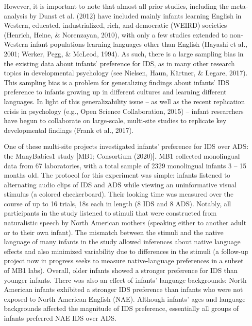 \documentclass[
  ,man,floatsintext]{apa6}
\begin{document}
However, it is important to note that almost all prior studies, including the meta-analysis by Dunst et al. (2012) have included mainly infants learning English in Western, educated, industrialized, rich, and democratic (WEIRD) societies (Henrich, Heine, \& Norenzayan, 2010), with only a few studies extended to non-Western infant populations learning languages other than English (Hayashi et al., 2001; Werker, Pegg, \& McLeod, 1994). As such, there is a large sampling bias in the existing data about infants' preference for IDS, as in many other research topics in developmental psychology (see Nielsen, Haun, Kärtner, \& Legare, 2017). This sampling bias is a problem for generalizing findings about infants' IDS preference to infants growing up in different cultures and learning different languages. In light of this generalizability issue -- as well as the recent replication crisis in psychology (e.g., Open Science Collaboration, 2015) -- infant researchers have begun to collaborate on large-scale, multi-site studies to replicate key developmental findings (Frank et al., 2017).

One of these multi-site projects investigated infants' preference for IDS over ADS: the ManyBabies1 study {[}MB1; Consortium (2020){]}. MB1 collected monolingual data from 67 laboratories, with a total sample of 2329 monolingual infants 3 -- 15 months old. The protocol for this experiment was simple: infants listened to alternating audio clips of IDS and ADS while viewing an uninformative visual stimulus (a colored checkerboard). Their looking time was measured over the course of up to 16 trials, 18s each in length (8 IDS and 8 ADS). Notably, all participants in the study listened to stimuli that were constructed from naturalistic speech by North American mothers (speaking either to another adult or to their own infant). The mismatch between the stimuli and the native language of many infants in the study allowed inferences about native language effects and also minimized variability due to differences in the stimuli (a follow-up project now in progress seeks to measure native-language preferences in a subset of MB1 labs). Overall, older infants showed a stronger preference for IDS than younger infants. There was also an effect of infants' language backgrounds: North American infants exhibited a stronger IDS preference than infants who were not exposed to North American English (NAE). Although infants' ages and language backgrounds affected the magnitude of IDS preference, essentially all groups of infants preferred NAE IDS over ADS.
\end{document}
